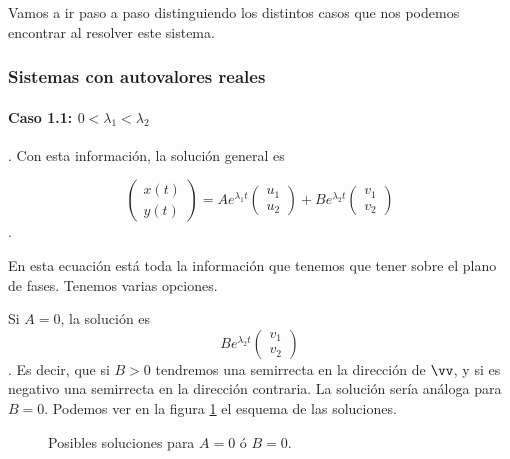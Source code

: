 \documentclass[nochap]{apuntes}
\begin{document}
Vamos a ir paso a paso distinguiendo los distintos casos que nos podemos encontrar al resolver este sistema.

\subsubsection{Sistemas con autovalores reales}

\paragraph{Caso 1.1: $0< λ_1 < λ_2$}. Con esta información, la solución general es 

\[ \begin{pmatrix} x(t) \\ y(t) \end{pmatrix} = A e^{λ_1t}\begin{pmatrix} u_1 \\ u_2\end{pmatrix} + B e^{λ_2t} \begin{pmatrix} v_1 \\ v_2 \end{pmatrix} \].

En esta ecuación está toda la información que tenemos que tener sobre el plano de fases. Tenemos varias opciones. 

Si $A = 0$, la solución es \[ B e^{λ_2t} \begin{pmatrix} v_1 \\ v_2 \end{pmatrix} \]. Es decir, que si $B>0$ tendremos una semirrecta en la dirección de $\vv$, y si es negativo una semirrecta en la dirección contraria. La solución sería análoga para $B=0$. Podemos ver en la figura \ref{imgABUnoCero} el esquema de las soluciones.

\begin{figure}[hbtp]
\centering
{}
\caption{Posibles soluciones para $A=0$ ó $B=0$.}
\label{imgABUnoCero}
\end{figure}
\end{document}
